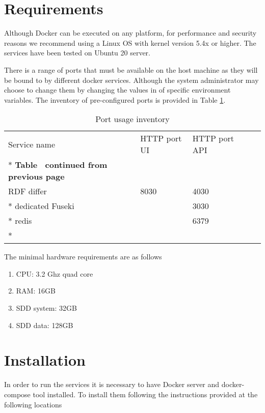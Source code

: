 \section{Requirements}
\label{sec:requirements}

Although Docker can be executed on any platform, for performance and security reasons we recommend using a Linux OS with kernel version 5.4x or higher. The services have been tested on Ubuntu 20 server. 

There is a range of ports that must be available on the host machine as they will be bound to by different docker services. Although the system administrator may choose to change them by changing the values in of specific environment variables. The inventory of pre-configured ports is provided in Table \ref{tab:port-inventory}.

\begin{longtable}[c]{@{}p{3.64cm}p{1.25cm}p{1.25cm}p{1.9cm}p{5cm}@{}}
	\toprule
	Service name     & HTTP port UI & HTTP port API             \\* \midrule
	\endfirsthead
	\multicolumn{5}{c}%
	{{\bfseries Table \thetable\ continued from previous page}} \\
	\endhead
	\bottomrule
	\endfoot
	\endlastfoot
	RDF differ       & 8030         & 4030                      \\* \hline
	dedicated Fuseki &              & 3030                      \\* \hline
	redis            &              & 6379                      \\* \bottomrule
	\caption{Port usage inventory}
	\label{tab:port-inventory}                                  \\
\end{longtable}

The minimal hardware requirements are as follows 
\begin{enumerate}
	\item CPU: 3.2 Ghz quad core
	\item RAM: 16GB
	\item SDD system: 32GB
	\item SDD data: 128GB
\end{enumerate}

\section{Installation}
\label{sec:installation}

In order to run the services it is necessary to have Docker server and docker-compose tool installed. To install them following the instructions provided at the following locations

